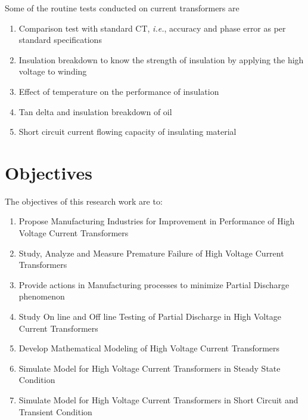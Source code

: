 Some of the routine tests conducted on current transformers are\setlength{\parskip}{0em} 

\begin{enumerate}[label=\Roman*.]
\item Comparison test with standard CT, \textit{i.e.}, accuracy and phase error as per standard specifications

\item Insulation breakdown to know the strength of insulation by applying the high voltage to winding

\item Effect of temperature on the performance of insulation

\item Tan delta and insulation breakdown of oil

\item Short circuit current flowing capacity of insulating material
\end{enumerate}

\pagebreak 
\section{Objectives}
The objectives of this research work are to:
\begin{enumerate}
\item Propose Manufacturing Industries for Improvement in Performance of High Voltage Current Transformers

\item Study, Analyze and Measure Premature Failure of High Voltage Current Transformers

\item Provide actions in Manufacturing processes to minimize Partial Discharge phenomenon

\item Study On line and Off line Testing of Partial Discharge in High Voltage Current Transformers

\item Develop Mathematical Modeling of High Voltage Current Transformers

\item Simulate Model for High Voltage Current Transformers in Steady State Condition

\item Simulate Model for High Voltage Current Transformers in Short Circuit and Transient Condition
\end{enumerate}

